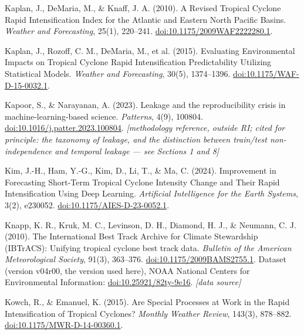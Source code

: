\documentclass[11pt]{article}
\begin{document}
\begin{references}
\item Kaplan, J., DeMaria, M., \& Knaff, J. A. (2010). A Revised Tropical
Cyclone Rapid Intensification Index for the Atlantic and Eastern North Pacific
Basins. \emph{Weather and Forecasting}, 25(1), 220--241.
\href{https://doi.org/10.1175/2009WAF2222280.1}{doi:10.1175/2009WAF2222280.1}.

\item Kaplan, J., Rozoff, C. M., DeMaria, M., et al. (2015). Evaluating
Environmental Impacts on Tropical Cyclone Rapid Intensification Predictability
Utilizing Statistical Models. \emph{Weather and Forecasting}, 30(5),
1374--1396.
\href{https://doi.org/10.1175/WAF-D-15-0032.1}{doi:10.1175/WAF-D-15-0032.1}.

\item Kapoor, S., \& Narayanan, A. (2023). Leakage and the reproducibility
crisis in machine-learning-based science. \emph{Patterns}, 4(9), 100804.
\href{https://doi.org/10.1016/j.patter.2023.100804}%
{doi:10.1016/j.patter.2023.100804}.
\emph{[methodology reference, outside RI; cited for principle: the taxonomy of
leakage, and the distinction between train/test non-independence and temporal
leakage --- see Sections 1 and 8]}

\item Kim, J.-H., Ham, Y.-G., Kim, D., Li, T., \& Ma, C. (2024). Improvement
in Forecasting Short-Term Tropical Cyclone Intensity Change and Their Rapid
Intensification Using Deep Learning. \emph{Artificial Intelligence for the
Earth Systems}, 3(2), e230052.
\href{https://doi.org/10.1175/AIES-D-23-0052.1}{doi:10.1175/AIES-D-23-0052.1}.

\item Knapp, K. R., Kruk, M. C., Levinson, D. H., Diamond, H. J., \& Neumann,
C. J. (2010). The International Best Track Archive for Climate Stewardship
(IBTrACS): Unifying tropical cyclone best track data. \emph{Bulletin of the
American Meteorological Society}, 91(3), 363--376.
\href{https://doi.org/10.1175/2009BAMS2755.1}{doi:10.1175/2009BAMS2755.1}.
Dataset (version v04r00, the version used here), NOAA National Centers for
Environmental Information:
\href{https://doi.org/10.25921/82ty-9e16}{doi:10.25921/82ty-9e16}.
\emph{[data source]}

\item Kowch, R., \& Emanuel, K. (2015). Are Special Processes at Work in the
Rapid Intensification of Tropical Cyclones? \emph{Monthly Weather Review},
143(3), 878--882.
\href{https://doi.org/10.1175/MWR-D-14-00360.1}{doi:10.1175/MWR-D-14-00360.1}.


\end{references}
\end{document}
